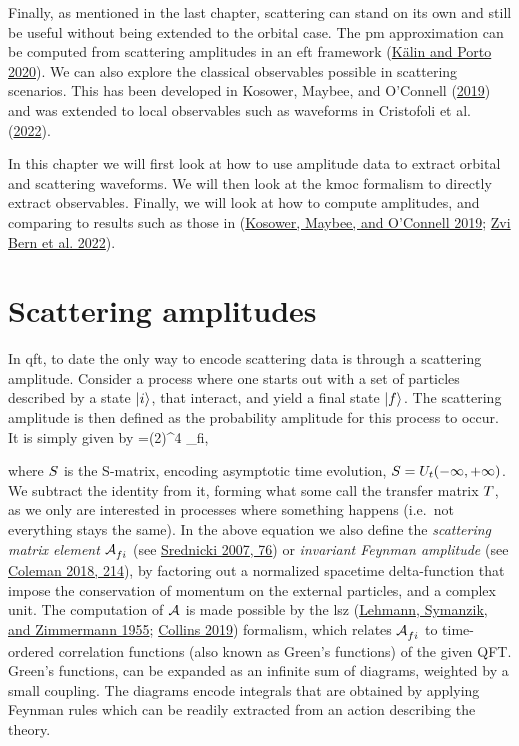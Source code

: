 \documentclass[
  11pt,
  a4paper,
  DIV=11,
  numbers=noendperiod,
  oneside]{scrreprt}
\let\[\relax \let\]\relax %
\DeclareRobustCommand{\[}{\begin{equation}}
\DeclareRobustCommand{\]}{\end{equation}}
\begin{document}
Finally, as mentioned in the last chapter, scattering can stand on its
own and still be useful without being extended to the orbital case. The
\gls{pm} approximation can be computed from scattering amplitudes in an
\gls{eft} framework (\protect\hyperlink{ref-Kalin:2020mvi}{Kälin and
Porto 2020}). We can also explore the classical observables possible in
scattering scenarios. This has been developed in Kosower, Maybee, and
O'Connell (\protect\hyperlink{ref-Kosower:2018adc}{2019}) and was
extended to local observables  such as waveforms in
Cristofoli et al. (\protect\hyperlink{ref-Cristofoli:2021vyo}{2022}).

In this chapter we will first look at how to use amplitude data to
extract orbital and scattering waveforms. We will then look at the
\gls{kmoc} formalism to directly extract observables. Finally, we will
look at how to compute amplitudes, and comparing to results such as
those in (\protect\hyperlink{ref-Kosower:2018adc}{Kosower, Maybee, and
O'Connell 2019}; \protect\hyperlink{ref-Bern:2021xze}{Zvi Bern et al.
2022}).

\hypertarget{sec-scatamp}{%
\section{Scattering amplitudes}\label{sec-scatamp}}

In \gls{qft}, to date the only way to encode scattering data is through
a scattering amplitude. Consider a process where one starts out with a
set of particles described by a state \(\vert i \rangle_{\text{}}\), that interact, and
yield a final state \(\vert f \rangle_{\text{}}\). The scattering amplitude is then
defined as the probability amplitude for this process to occur. It is
simply given by
\[=(2\pi)^4 \im \ampl_{fi},\]

where \(S\) is the S-matrix, encoding asymptotic time evolution,
\(S=U_t(-\infty,+\infty)\). We subtract the identity from it,
forming what some call the transfer matrix \(T\), as we only are
interested in processes where something happens (i.e.~not everything
stays the same). In the above equation we also define the
\emph{scattering matrix element} \(\mathcal{A}^{}_{fi}\) (see
\protect\hyperlink{ref-Srednicki:2007}{Srednicki 2007, 76}) or
\emph{invariant Feynman amplitude} (see
\protect\hyperlink{ref-Coleman:2018a}{Coleman 2018, 214}), by factoring
out a normalized spacetime delta-function that impose the conservation
of momentum on the external particles, and a complex unit. The
computation of \(\mathcal{A}^{}\) is made possible by the \gls{lsz}
(\protect\hyperlink{ref-Lehmann:1954rq}{Lehmann, Symanzik, and
Zimmermann 1955}; \protect\hyperlink{ref-Collins:2019ozc}{Collins 2019})
formalism, which relates \(\mathcal{A}^{}_{fi}\) to time-ordered correlation
functions (also known as Green's functions) of the given QFT. Green's
functions, can be expanded as an infinite sum of diagrams, weighted by a
small coupling. The diagrams encode integrals that are obtained by
applying Feynman rules which can be readily extracted from an action
describing the theory.
\end{document}

